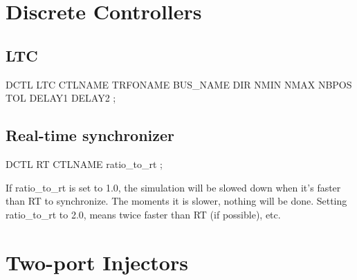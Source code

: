 \section{Discrete Controllers}


\subsection{LTC}

DCTL LTC CTLNAME TRFONAME BUS\_NAME DIR NMIN
NMAX NBPOS TOL DELAY1 DELAY2 ; 

\subsection{Real-time synchronizer}

DCTL RT CTLNAME ratio\_to\_rt ; 

If ratio\_to\_rt is set to 1.0, the simulation will be slowed down
when it's faster than RT to synchronize. The moments it is slower,
nothing will be done. Setting ratio\_to\_rt to 2.0, means twice faster
than RT (if possible), etc.



%
%
%




\section{Two-port Injectors}


